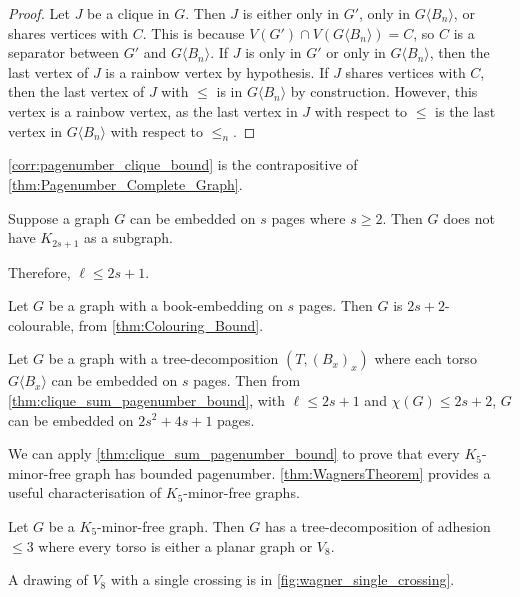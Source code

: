 \begin{proof}
	Let \(J\) be a clique in \(G\). Then $J$ is either only in $G'$, only in $G\langle B_n \rangle$, or shares vertices with $C$. This is because $V(G') \cap V(G\langle B_n \rangle) = C$, so $C$ is a separator between $G'$ and $G \langle B_n \rangle$. If $J$ is only in $G'$ or only in $G\langle B_n \rangle$, then the last vertex of $J$ is a rainbow vertex by hypothesis. If $J$ shares vertices with $C$, then the last vertex of $J$ with $\leq$ is in $G\langle B_n \rangle$ by construction. However, this vertex is a rainbow vertex, as the last vertex in $J$ with respect to $\leq$ is the last vertex in $G\langle B_n \rangle$ with respect to $\leq_n$. 
\end{proof}

\cref{corr:pagenumber_clique_bound} is the contrapositive of \cref{thm:Pagenumber_Complete_Graph}.

\begin{corollary}\label{corr:pagenumber_clique_bound}
	Suppose a graph $G$ can be embedded on $s$ pages where $s \geq 2$. Then \(G\) does not have $K_{2s + 1}$ as a subgraph.
\end{corollary}
Therefore, \(\ell \leq 2s + 1\).

Let $G$ be a graph with a book-embedding on $s$ pages. Then $G$ is $2s + 2$-colourable, from \cref{thm:Colouring_Bound}.
\begin{corollary}\label{corr:bded_pn_tree_decomp}
	Let \(G\) be a graph with a tree-decomposition \((T, (B_x)_x)\) where each torso \(G \langle B_x \rangle\) can be embedded on $s$ pages. Then from \cref{thm:clique_sum_pagenumber_bound}, with $\ell \leq 2s + 1$ and $\chi(G) \leq 2 s + 2$, \(G\) can be embedded on \(2s^2 + 4s + 1\) pages.
\end{corollary}

We can apply \cref{thm:clique_sum_pagenumber_bound} to prove that every $K_5$-minor-free graph has bounded pagenumber. \cref{thm:WagnersTheorem} provides a useful characterisation of $K_5$-minor-free graphs. 
\begin{theorem}\label{thm:WagnersTheorem}
	Let \(G\) be a \(K_5\)-minor-free graph. Then \(G\) has a tree-decomposition of adhesion $\leq 3$ where every torso is either a planar graph or \(V_8\).
\end{theorem}

A drawing of $V_8$ with a single crossing is in \cref{fig:wagner_single_crossing}. 

